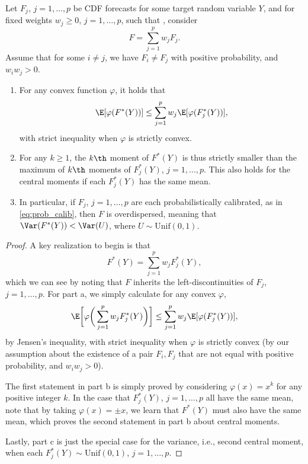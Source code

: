 \documentclass{article}
\begin{document}
\begin{theorem}
\label{thm:prob_prob}
Let $F_j$, $j=1,\dots,p$ be CDF forecasts for some target random variable $Y$,
and for fixed weights $w_j \geq 0$, $j=1,\dots,p$, such that
, consider  
\[
F = \sum_{j=1}^p w_j F_j.
\]
Assume that for some $i \not= j$, we have $F_i \not= F_j$ with positive 
probability, and $w_iw_j > 0$. 

\begin{enumerate}[label=\alph*.]
\item For any convex function $\varphi$, it holds that
\[
\E[\varphi(F^*(Y))] \leq \sum_{j=1}^p w_j \E[\varphi(F_j^*(Y))], 
\]
with strict inequality when $\varphi$ is strictly convex.

\item For any $k \geq 1$, the $k\th$ moment of $F^*(Y)$ is thus strictly smaller 
  than the maximum of $k\th$ moments of $F_j^*(Y)$, $j=1,\dots,p$. This also
  holds for the central moments if each $F_j^*(Y)$ has the same mean.

\item In particular, if $F_j$, $j=1,\dots,p$ are each probabilistically
  calibrated, as in \eqref{eq:prob_calib}, then $F$ is overdispersed, meaning
  that $\Var(F^*(Y)) < \Var(U)$, where $U \sim \mathrm{Unif}(0,1)$.  
\end{enumerate}
\end{theorem}

\begin{proof}
A key realization to begin is that
\[
F^*(Y) = \sum_{j=1}^p w_j F_j^*(Y),
\]
which we can see by noting that $F$ inherits the left-discontinuities of $F_j$,
$j=1,\dots,p$. For part a, we simply calculate for any convex $\varphi$,  
\[
\E\bigg[\varphi\bigg( \sum_{j=1}^p w_j F_j^*(Y) \bigg)\bigg] \leq 
\sum_{j=1}^p w_j \E[\varphi(F_j^*(Y))],
\]
by Jensen's inequality, with strict inequality when $\varphi$ is strictly 
convex (by our assumption about the existence of a pair $F_i,F_j$ that are 
not equal with positive probability, and $w_iw_j>0$).

The first statement in part b is simply proved by considering $\varphi(x) = x^k$
for any positive integer $k$. In the case that $F_j^*(Y)$, $j=1,\dots,p$ all
have the same mean, note that by taking $\varphi(x) = \pm x$, we learn that
$F^*(Y)$ must also have the same mean, which proves the second statement in part
b about central moments.

Lastly, part c is just the special case for the variance, i.e., second central
moment, when each $F_j^*(Y) \sim \mathrm{Unif}(0,1)$, $j=1,\dots,p$.
\end{proof}
\end{document}
